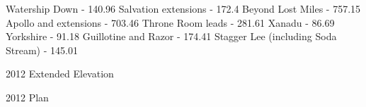 
Watership Down - 140.96
Salvation extensions - 172.4
Beyond Lost Miles - 757.15
Apollo and extensions - 703.46
Throne Room leads - 281.61
Xanadu - 86.69
Yorkshire - 91.18
Guillotine and Razor - 174.41
Stagger Lee (including Soda Stream) - 145.01
















\begin{pagesurvey}
\centering
{}
\caption[2012 System Migovec Extended Elevation]{2012  Extended Elevation}
\end{pagesurvey}

\begin{pagesurvey}
\centering
{}
\caption[2012 System Migovec Plan]{2012  Plan}
\end{pagesurvey}